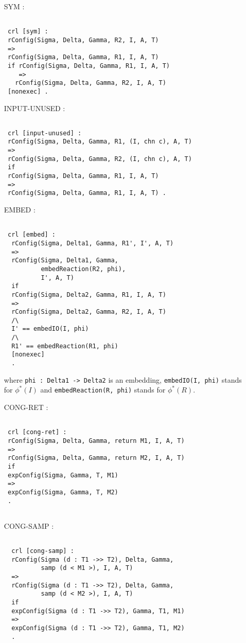 \documentclass{article}
\begin{document}
\begin{itemize} 
\item[SYM]:
\begin{lstlisting}

 crl [sym] : 
 rConfig(Sigma, Delta, Gamma, R2, I, A, T) 
 => 
 rConfig(Sigma, Delta, Gamma, R1, I, A, T)
 if rConfig(Sigma, Delta, Gamma, R1, I, A, T) 
    =>
   rConfig(Sigma, Delta, Gamma, R2, I, A, T)
 [nonexec] .
 \end{lstlisting} 
 
\item[INPUT-UNUSED] :
\begin{lstlisting}
 
 crl [input-unused] :
 rConfig(Sigma, Delta, Gamma, R1, (I, chn c), A, T)
 =>
 rConfig(Sigma, Delta, Gamma, R2, (I, chn c), A, T)
 if
 rConfig(Sigma, Delta, Gamma, R1, I, A, T) 
 =>
 rConfig(Sigma, Delta, Gamma, R1, I, A, T) .
\end{lstlisting} 
 
\item[EMBED]:
\begin{lstlisting}
 
 crl [embed] :   
  rConfig(Sigma, Delta1, Gamma, R1', I', A, T)
  =>
  rConfig(Sigma, Delta1, Gamma, 
          embedReaction(R2, phi), 
          I', A, T)
  if
  rConfig(Sigma, Delta2, Gamma, R1, I, A, T)
  =>
  rConfig(Sigma, Delta2, Gamma, R2, I, A, T)
  /\
  I' == embedIO(I, phi) 
  /\
  R1' == embedReaction(R1, phi)
  [nonexec]
  .
  \end{lstlisting}
  \noindent where 
  \texttt{phi : Delta1 -> Delta2} is an embedding,  
  \texttt{embedIO(I, phi)} stands for $\phi^*(I)$ and
  \texttt{embedReaction(R, phi)} stands for $\phi^*(R)$.
\item[CONG-RET]:
\begin{lstlisting} 

 crl [cong-ret] : 
 rConfig(Sigma, Delta, Gamma, return M1, I, A, T) 
 => 
 rConfig(Sigma, Delta, Gamma, return M2, I, A, T)
 if
 expConfig(Sigma, Gamma, T, M1) 
 => 
 expConfig(Sigma, Gamma, T, M2) 
 .       
 
  \end{lstlisting} 
\item[CONG-SAMP]:
\begin{lstlisting}
 
  crl [cong-samp] :
  rConfig(Sigma (d : T1 ->> T2), Delta, Gamma,  
          samp (d < M1 >), I, A, T) 
  => 
  rConfig(Sigma (d : T1 ->> T2), Delta, Gamma, 
          samp (d < M2 >), I, A, T) 
  if 
  expConfig(Sigma (d : T1 ->> T2), Gamma, T1, M1) 
  => 
  expConfig(Sigma (d : T1 ->> T2), Gamma, T1, M2) 
  . 
  

\end{lstlisting}
\end{itemize}
\end{document}
